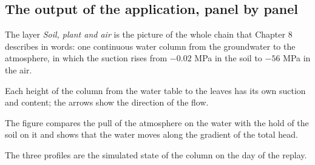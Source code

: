 \subsection{The output of the application, panel by panel}
The layer \emph{Soil, plant and air} is the picture of the whole chain that Chapter 8 describes in words: one continuous water column from the groundwater to the atmosphere, in which the suction rises from $-0.02$ MPa in the soil to $-56$ MPa in the air.

Each height of the column from the water table to the leaves has its own suction and content; the arrows show the direction of the flow.


The figure compares the pull of the atmosphere on the water with the hold of the soil on it and shows that the water moves along the gradient of the total head.


The three profiles are the simulated state of the column on the day of the replay.


